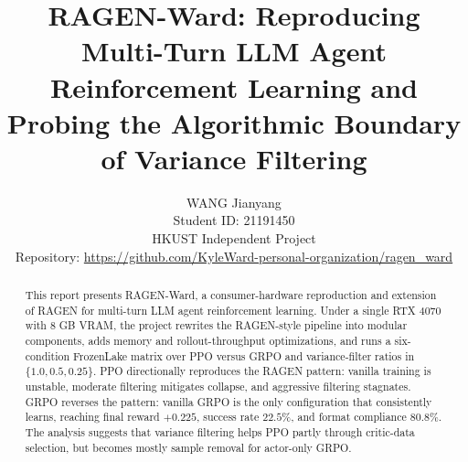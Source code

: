 \documentclass[11pt]{article}
\title{RAGEN-Ward: Reproducing Multi-Turn LLM Agent Reinforcement Learning and Probing the Algorithmic Boundary of Variance Filtering}
\author{
WANG Jianyang \\
Student ID: 21191450 \\
HKUST Independent Project \\
Repository: \url{https://github.com/KyleWard-personal-organization/ragen_ward}
}
\newcommand{\method}{RAGEN-Ward}
\begin{document}
\maketitle

\begin{abstract}
This report presents \method, a consumer-hardware reproduction and extension of RAGEN for multi-turn LLM agent reinforcement learning. Under a single RTX 4070 with 8 GB VRAM, the project rewrites the RAGEN-style pipeline into modular components, adds memory and rollout-throughput optimizations, and runs a six-condition FrozenLake matrix over PPO versus GRPO and variance-filter ratios in \(\{1.0, 0.5, 0.25\}\). PPO directionally reproduces the RAGEN pattern: vanilla training is unstable, moderate filtering mitigates collapse, and aggressive filtering stagnates. GRPO reverses the pattern: vanilla GRPO is the only configuration that consistently learns, reaching final reward \(+0.225\), success rate \(22.5\%\), and format compliance \(80.8\%\). The analysis suggests that variance filtering helps PPO partly through critic-data selection, but becomes mostly sample removal for actor-only GRPO.
\end{abstract}











\appendix

\end{document}
